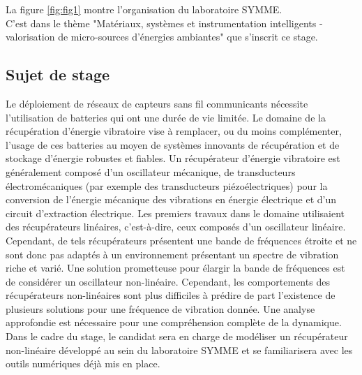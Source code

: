 \documentclass[a4paper, french, 12pt, titlepage]{article}
\begin{document}
La figure \ref{fig:fig1} montre l'organisation du laboratoire SYMME. \\

C'est dans le thème "Matériaux, systèmes et instrumentation intelligents - valorisation de micro-sources d'énergies ambiantes" que s'inscrit ce stage. 

\subsection{Sujet de stage}

Le déploiement de réseaux de capteurs sans fil communicants nécessite l’utilisation de batteries qui ont une durée de vie limitée.
 Le domaine de la récupération d’énergie vibratoire vise à remplacer, ou du moins complémenter, l’usage de ces batteries au moyen de systèmes innovants de récupération et de stockage d’énergie robustes et fiables.
  Un récupérateur d’énergie vibratoire est généralement composé d’un oscillateur mécanique, de transducteurs électromécaniques (par exemple des transducteurs piézoélectriques) pour la conversion de l’énergie mécanique des vibrations en énergie électrique et d’un circuit d’extraction électrique.
   Les premiers travaux dans le domaine utilisaient des récupérateurs linéaires, c’est-à-dire, ceux composés d’un oscillateur linéaire.
    Cependant, de tels récupérateurs présentent une bande de fréquences étroite et ne sont donc pas adaptés à un environnement présentant un spectre de vibration riche et varié. 
    Une solution prometteuse pour élargir la bande de fréquences est de considérer un oscillateur non-linéaire. 
    Cependant, les comportements des récupérateurs non-linéaires sont plus difficiles à prédire de part l’existence de plusieurs solutions pour une fréquence de vibration donnée. 
    Une analyse approfondie est nécessaire pour une compréhension complète de la dynamique.
     Dans le cadre du stage, le candidat sera en charge de modéliser un récupérateur non-linéaire développé au sein du laboratoire SYMME et se familiarisera avec les outils numériques déjà mis en place.\\
\end{document}
